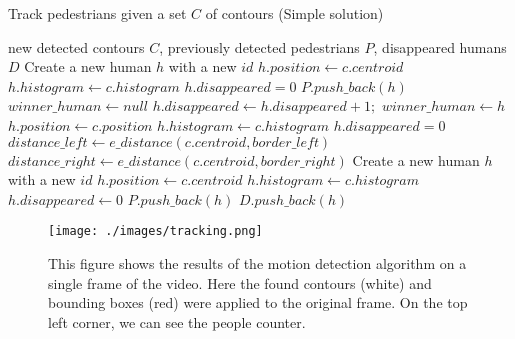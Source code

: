 \documentclass[runningheads]{llncs}
\begin{document}
\begin{algorithm}
\caption{Track pedestrians given a set $C$ of contours (Simple solution)}
\label{tracking_algo}
\begin{algorithmic}[1]
\Require new detected contours $C$, previously detected pedestrians $P$, disappeared humans $D$
\State
{}
\State Create a new human $h$ with a new $id$
\State $h.position \gets c.centroid$
\State $h.histogram \gets c.histogram$
\State $h.disappeared = 0$
\State $P.push\_back(h)$
\EndFor
\Else
\State 
{}
\State $winner\_human \gets null$
\State $h.disappeared \gets h.disappeared+1;$
\State $winner\_human \gets h$
\EndIf
\EndIf
\EndIf
\EndFor
\State 
{}
\State $h.position \gets c.position $
\State $h.histogram \gets c.histogram$
\State $h.disappeared = 0$
\Else
\State $distance\_left \gets e\_distance(c.centroid, border\_left)$
\State $distance\_right \gets e\_distance(c.centroid, border\_right)$
\State Create a new human $h$ with a new $id$
\State $h.position \gets c.centroid$
\State $h.histogram \gets c.histogram$
\State $h.disappeared \gets 0$
\State $P.push\_back(h)$
\EndIf
\EndIf
\EndFor
\State
{}
\State $D.push\_back(h)$
\EndIf
\EndFor
\EndIf
\end{algorithmic}
\end{algorithm}

\begin{figure}
\texttt{[image: ./images/tracking.png]}
\caption{This figure shows the results of the motion detection algorithm on a single frame of the video. Here the found contours (white) and bounding boxes (red) were applied to the original frame. On the top left corner, we can see the people counter.}
\label{tracking}

\end{figure}
\end{document}
